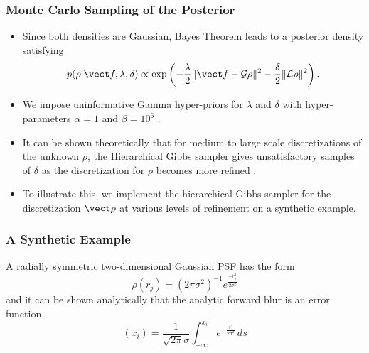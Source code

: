 \documentclass[]{beamer}
\begin{document}
\begin{frame}[t]
  \frametitle{Monte Carlo Sampling of the Posterior}
  {\footnotesize
  \begin{itemize}
    \itemsep 1.2em
    \item Since both densities are Gaussian, Bayes Theorem leads to a \alert{posterior density} satisfying 
      $$
	p(\rho|\vect f,\lambda,\delta ) \propto \exp\left( -\frac\lambda2 \|\vect f - \mathcal G\rho\|^2 - \frac\delta2 \| \mathcal L\rho \|^2 \right).
      $$
    \item We impose uninformative Gamma hyper-priors for $\lambda$ and $\delta$ with hyper-parameters $\alpha = 1$ and $\beta = 10^6$ \cite{calvetti2008hypermodels}.%
    \item It can be shown theoretically that for medium to large scale discretizations of the unknown $\rho$, the \alert{Hierarchical Gibbs sampler} gives unsatisfactory samples of $\delta$ as the discretization for $\rho$ becomes more refined \cite{agapiou2014analysis}.
    \item To illustrate this, we implement the hierarchical Gibbs sampler for the discretization $\vect \rho$ at various levels of refinement on a synthetic example. 
  \end{itemize}
  }
\end{frame}

\begin{frame}[t]
  \frametitle{A Synthetic Example}
  A radially symmetric two-dimensional \alert{Gaussian PSF} has the form
  \begin{equation*}
    \rho(r_j) = (2\pi\sigma^2)^{-1} e^{\frac{-r_j^2}{2\sigma^2}} 
  \end{equation*}
  and it can be shown analytically that the analytic forward blur is an \alert{error function}
  \begin{equation*}
    [\mathcal G \rho] (x_i) = \frac 1{\sqrt{2\pi}\sigma} \int_{-\infty}^{x_i} e^{-\frac{s^2}{2\sigma^2}}\,ds
  \end{equation*} 
\end{frame}
\end{document}
